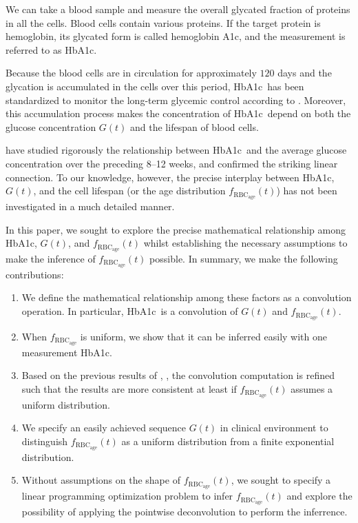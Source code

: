 \documentclass{article}
\newcommand{\hba}{\textrm{HbA1c}}
\newcommand{\f}{f_{\mathrm{RBC}_{\mathrm{age}}}}
\begin{document}
We can take a blood sample and measure the overall glycated fraction of proteins in all the cells.  Blood cells contain various proteins. If the target protein is hemoglobin, its glycated form is called hemoglobin A1c, and the measurement is referred to as \hba.

Because the blood cells are in circulation for approximately $120$ days and the glycation is accumulated in the cells over this period, \hba\ has been standardized to monitor the long-term glycemic control according to \citet{berg2008haemoglobin}. Moreover, this accumulation process makes the concentration of \hba\ depend on both the glucose concentration $G(t)$ and the lifespan of blood cells. 

\citet{nathan2008translating}\cite{nathan2007relationship}\cite{nathan1984clinical} have studied rigorously the relationship between \hba\ and the average glucose concentration over the preceding 8--12 weeks, and confirmed the striking linear connection. To our knowledge, however, the precise interplay between \hba, $G(t)$, and the cell lifespan (or the age distribution $\f(t)$) has not been investigated in a much detailed manner.

In this paper, we sought to explore the precise mathematical relationship among \hba, $G(t)$, and $\f(t)$ whilst establishing the necessary assumptions to make the inference of $\f(t)$ possible. In summary, we make the following contributions:  
\begin{enumerate}
\item We define the mathematical relationship among these factors as a convolution operation. In particular, \hba\ is a convolution of $G(t)$ and $\f(t)$.
\item When $\f$ is uniform, we show that it can be inferred easily with one measurement \hba.
\item Based on the previous results of \citet{nathan2008translating}, \citet{kahn2007consensus}, the convolution computation is refined such that the results are more consistent at least if $\f(t)$ assumes a uniform distribution.
\item We specify an easily achieved sequence $G(t)$ in clinical environment to distinguish $\f(t)$ as a uniform distribution from a finite exponential distribution.
\item Without assumptions on the shape of $\f(t)$, we sought to specify a linear programming optimization problem to infer $\f(t)$ and explore the possibility of applying the pointwise deconvolution to perform the inferrence.
\end{enumerate}
\end{document}
